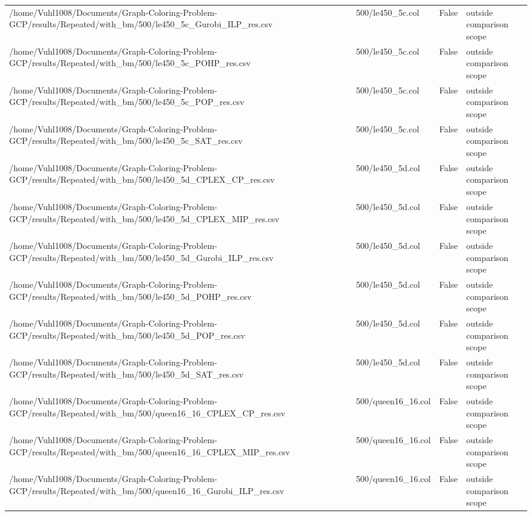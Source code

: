 \begin{table}[htbp]
\begin{tabular}{llll}
/home/Vuhl1008/Documents/Graph-Coloring-Problem-GCP/results/Repeated/with\_bm/500/le450\_5c\_Gurobi\_ILP\_res.csv & 500/le450\_5c.col & False & outside comparison scope \\
/home/Vuhl1008/Documents/Graph-Coloring-Problem-GCP/results/Repeated/with\_bm/500/le450\_5c\_POHP\_res.csv & 500/le450\_5c.col & False & outside comparison scope \\
/home/Vuhl1008/Documents/Graph-Coloring-Problem-GCP/results/Repeated/with\_bm/500/le450\_5c\_POP\_res.csv & 500/le450\_5c.col & False & outside comparison scope \\
/home/Vuhl1008/Documents/Graph-Coloring-Problem-GCP/results/Repeated/with\_bm/500/le450\_5c\_SAT\_res.csv & 500/le450\_5c.col & False & outside comparison scope \\
/home/Vuhl1008/Documents/Graph-Coloring-Problem-GCP/results/Repeated/with\_bm/500/le450\_5d\_CPLEX\_CP\_res.csv & 500/le450\_5d.col & False & outside comparison scope \\
/home/Vuhl1008/Documents/Graph-Coloring-Problem-GCP/results/Repeated/with\_bm/500/le450\_5d\_CPLEX\_MIP\_res.csv & 500/le450\_5d.col & False & outside comparison scope \\
/home/Vuhl1008/Documents/Graph-Coloring-Problem-GCP/results/Repeated/with\_bm/500/le450\_5d\_Gurobi\_ILP\_res.csv & 500/le450\_5d.col & False & outside comparison scope \\
/home/Vuhl1008/Documents/Graph-Coloring-Problem-GCP/results/Repeated/with\_bm/500/le450\_5d\_POHP\_res.csv & 500/le450\_5d.col & False & outside comparison scope \\
/home/Vuhl1008/Documents/Graph-Coloring-Problem-GCP/results/Repeated/with\_bm/500/le450\_5d\_POP\_res.csv & 500/le450\_5d.col & False & outside comparison scope \\
/home/Vuhl1008/Documents/Graph-Coloring-Problem-GCP/results/Repeated/with\_bm/500/le450\_5d\_SAT\_res.csv & 500/le450\_5d.col & False & outside comparison scope \\
/home/Vuhl1008/Documents/Graph-Coloring-Problem-GCP/results/Repeated/with\_bm/500/queen16\_16\_CPLEX\_CP\_res.csv & 500/queen16\_16.col & False & outside comparison scope \\
/home/Vuhl1008/Documents/Graph-Coloring-Problem-GCP/results/Repeated/with\_bm/500/queen16\_16\_CPLEX\_MIP\_res.csv & 500/queen16\_16.col & False & outside comparison scope \\
/home/Vuhl1008/Documents/Graph-Coloring-Problem-GCP/results/Repeated/with\_bm/500/queen16\_16\_Gurobi\_ILP\_res.csv & 500/queen16\_16.col & False & outside comparison scope \\

\end{tabular}
\end{table}
